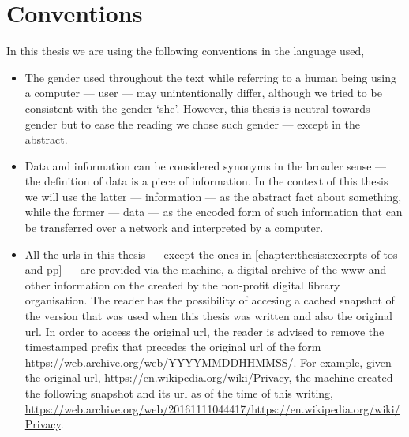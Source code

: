 \section{Conventions}
    \label{section:thesis:conventions}
In this thesis we are using the following conventions in the language used,
\begin{itemize}
    \item The gender used throughout the text while referring to a human being using 
    a computer --- user --- may unintentionally differ, although we tried to be 
    consistent with the gender `she'. However, this thesis is neutral towards gender 
    but to ease the reading we chose such gender --- except in the abstract.

    \item Data and information can be considered synonyms in the broader sense --- 
    the definition of data is a piece of information. In the context of this thesis 
    we will use the latter --- information --- as the abstract fact about something, 
    while the former --- data --- as the encoded form of such information that can 
    be transferred over a network and interpreted by a computer.
    
    \item All the \acp{url} in this thesis --- except the ones in \cref{chapter:thesis:excerpts-of-tos-and-pp} ---
    are provided via the \Wayback machine, a digital archive of the \ac{www} and 
    other information on the \Internet created by the \InternetArchive non-profit 
    digital library organisation. The reader has the possibility of accesing a cached 
    snapshot of the version that was used when this thesis was written and also 
    the original \ac{url}. In order to access the original \ac{url}, the reader 
    is advised to remove the timestamped prefix that precedes the original \ac{url} 
    of the form \url{https://web.archive.org/web/YYYYMMDDHHMMSS/}. For example, 
    given the original \ac{url}, \url{https://en.wikipedia.org/wiki/Privacy}, the 
    \Wayback machine created the following snapshot and its \ac{url} as of the time 
    of this writing, \url{https://web.archive.org/web/20161111044417/https://en.wikipedia.org/wiki/Privacy}.
\end{itemize}
